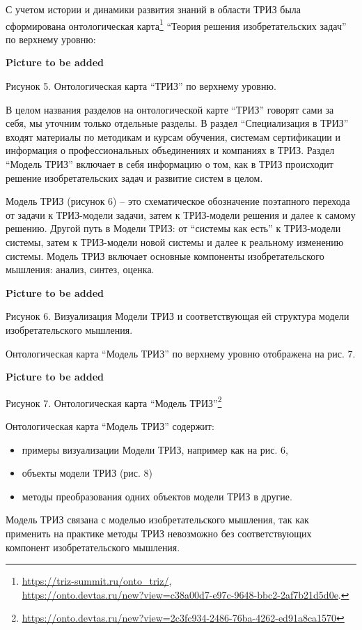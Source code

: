 \documentclass[11pt,a4paper]{article}
\newcommand{\addpicture}{\textbf{Picture to be added}\par}
\begin{document}
С учетом истории и динамики развития знаний в области ТРИЗ была сформирована
онтологическая карта\footnote{\url{https://triz-summit.ru/onto_triz/},\\
  \url{https://onto.devtas.ru/new?view=c38a00d7-e97c-9648-bbc2-2af7b21d5d0e}. }
“Теория решения изобретательских задач” по верхнему уровню:
\begin{center}
  \addpicture
  Рисунок 5. Онтологическая карта “ТРИЗ” по верхнему уровню.
\end{center}
В целом названия разделов на онтологической карте “ТРИЗ” говорят сами за себя,
мы уточним только отдельные разделы. В раздел “Специализация в ТРИЗ” входят
материалы по методикам и курсам обучения, системам сертификации и информация о
профессиональных объединениях и компаниях в ТРИЗ. Раздел “Модель ТРИЗ”
включает в себя информацию о том, как в ТРИЗ происходит решение
изобретательских задач и развитие систем в целом.

Модель ТРИЗ (рисунок 6) – это схематическое обозначение поэтапного перехода от
задачи к ТРИЗ-модели задачи, затем к ТРИЗ-модели решения и далее к самому
решению. Другой путь в Модели ТРИЗ: от “системы как есть” к ТРИЗ-модели
системы, затем к ТРИЗ-модели новой системы и далее к реальному изменению
системы.  Модель ТРИЗ включает основные компоненты изобретательского мышления:
анализ, синтез, оценка.

\begin{center}
  \addpicture
  Рисунок 6. Визуализация Модели ТРИЗ и соответствующая ей структура модели
  изобретательского мышления.
\end{center}

Онтологическая карта “Модель ТРИЗ” по верхнему уровню отображена на рис. 7.
\begin{center}
  \addpicture
  Рисунок 7. Онтологическая карта “Модель
  ТРИЗ”\footnote{\url{https://onto.devtas.ru/new?view=2c3fc934-2486-76ba-4262-ed91a8ca1570}} 
\end{center}
Онтологическая карта “Модель ТРИЗ” содержит:
\begin{itemize}[noitemsep]
\item примеры визуализации Модели ТРИЗ, например как на рис. 6,
\item объекты модели ТРИЗ (рис. 8)
\item методы преобразования одних объектов модели ТРИЗ в другие.
\end{itemize}
Модель ТРИЗ связана с моделью изобретательского мышления, так как применить на
практике методы ТРИЗ невозможно без соответствующих компонент
изобретательского мышления.
\end{document}

